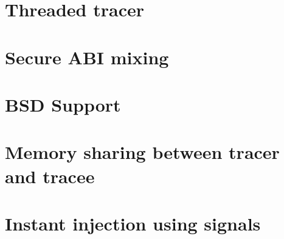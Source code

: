 \documentclass[a4paper, twoside, 10pt, twocolumn]{report}
\begin{document}
\section{Threaded tracer}


\section{Secure ABI mixing}


\section{BSD Support}


\section{Memory sharing between tracer and tracee}


\section{Instant injection using signals}


\end{document}
